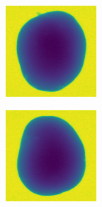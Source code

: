 \documentclass[11pt]{article}
\begin{document}
\begin{figure}[!h]
\begin{subfigure}[b]{0.22\textwidth}
         \caption{}
         \label{fig:perfect_5}
     \end{subfigure}
     \hfill
     \begin{subfigure}[b]{0.22\textwidth}
         \centering
         \includegraphics[width=\textwidth]{figurer/potato_dataset/perfect/perfect_6.jpg}
         \caption{}
         \label{fig:perfect_6}
     \end{subfigure}
     \hfill
     \begin{subfigure}[b]{0.22\textwidth}
         \centering
         \includegraphics[width=\textwidth]{figurer/potato_dataset/perfect/perfect_7.jpg}

\end{subfigure}
\end{figure}
\end{document}
